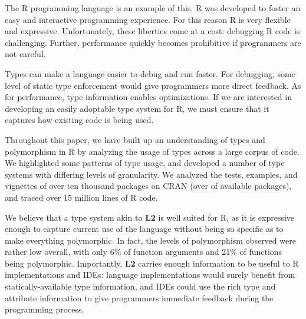 \documentclass[acmsmall,10pt,review,anonymous]{acmart}\settopmatter{printfolios=true,printccs=false,printacmref=false}
\begin{document}
The R programming language is an example of this.  R was developed to foster
an easy and interactive programming experience. For this reason R is very
flexible and expressive.  Unfortunately, these liberties come at a cost:
debugging R code is challenging. Further, performance quickly becomes
prohibitive if programmers are not careful.

Types can make a language easier to debug and run faster.  For debugging,
some level of static type enforcement would give programmers more direct
feedback.  As for performance, type information enables optimizations. If we
are interested in developing an easily adoptable type system for R, we must
ensure that it captures how existing code is being used.  

Throughout this paper, we have built up an understanding of types and
polymorphism in R by analyzing the usage of types across a large corpus of
code.  We highlighted some patterns of type usage, and developed a number of
type systems with differing levels of granularity. We analyzed the tests,
examples, and vignettes of over ten thousand packages on CRAN (over
\PERCENTCRAN of available packages), and traced over 15 million lines of R
code.

We believe that a type system akin to {\bf L2} is well suited for R, as it
is expressive enough to capture current use of the language without being so
specific as to make everything polymorphic.  In fact, the levels of
polymorphism observed were rather low overall, with only 6\% of function
arguments and 21\% of functions being polymorphic.  Importantly, {\bf L2}
carries enough information to be useful to R implementations and IDEs:
language implementations would surely benefit from statically-available type
information, and IDEs could use the rich type and attribute information to
give programmers immediate feedback during the programming process.

%
%
%


\end{document}

